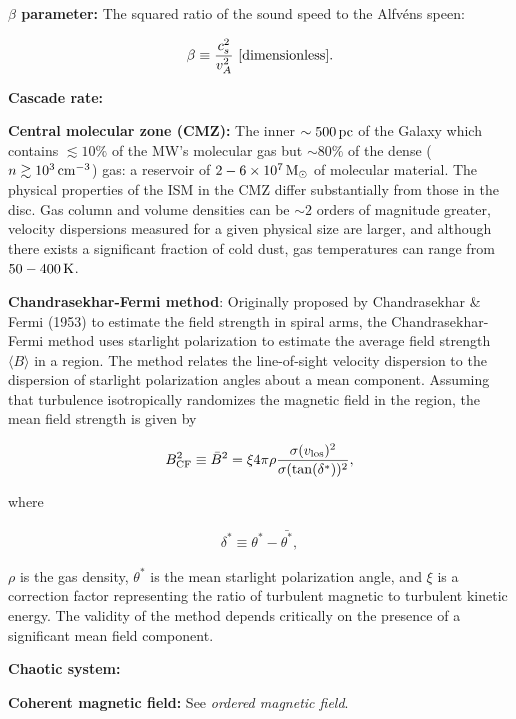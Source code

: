 \documentclass[a4paper,10pt]{article}
\begin{document}
{\noindent}\textbf{$\beta$ parameter:} The squared ratio of the sound speed to the Alfv\'ens speen:

\begin{align*}
    \beta \equiv \frac{c_s^2}{v_A^2} ~ [{\rm dimensionless}].
\end{align*}

{\noindent}\textbf{Cascade rate:}

{\noindent}\textbf{Central molecular zone (CMZ):} The inner $\sim500\,{\rm pc}$ of the Galaxy which contains $\lesssim10\%$ of the MW's molecular gas but $\sim80\%$ of the dense ($n\gtrsim10^3\,{\rm cm^{-3}}$) gas: a reservoir of $2-6\times10^7\,{\rm M_\odot}$ of molecular material. The physical properties of the ISM in the CMZ differ substantially from those in the disc. Gas column and volume densities can be $\sim2$ orders of magnitude greater, velocity dispersions measured for a given physical size are larger, and although there exists a significant fraction of cold dust, gas temperatures can range from $50-400\,{\rm K}$.

{\noindent}\textbf{Chandrasekhar-Fermi method}: Originally proposed by Chandrasekhar \& Fermi (1953) to estimate the field strength in spiral arms, the Chandrasekhar-Fermi method uses starlight polarization to estimate the average field strength $\langle B\rangle$ in a region. The method relates the line-of-sight velocity dispersion to the dispersion of starlight polarization angles about a mean component. Assuming that turbulence isotropically randomizes the magnetic field in the region, the mean field strength is given by

\begin{align*}
    B_{\rm CF}^2 \equiv \bar{B}^2 = \xi4\pi\rho \frac{\sigma(v_{\rm los})^2}{\sigma(\tan(\delta^*))^2},
\end{align*}

{\noindent}where

\begin{align*}
    \delta^* \equiv \theta^* - \bar{\theta^*},
\end{align*}

{\noindent}$\rho$ is the gas density, $\theta^*$ is the mean starlight polarization angle, and $\xi$ is a correction factor representing the ratio of turbulent magnetic to turbulent kinetic energy. The validity of the method depends critically on the presence of a significant mean field component.

{\noindent}\textbf{Chaotic system:}

{\noindent}\textbf{Coherent magnetic field:} See \textit{ordered magnetic field}.
\end{document}
